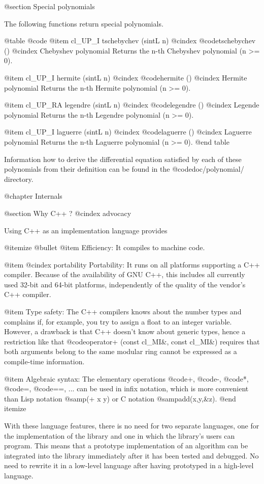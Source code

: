 @section Special polynomials

The following functions return special polynomials.

@table @code
@item cl_UP_I tschebychev (sintL n)
@cindex @code{tschebychev ()}
@cindex Chebyshev polynomial
Returns the n-th Chebyshev polynomial (n >= 0).

@item cl_UP_I hermite (sintL n)
@cindex @code{hermite ()}
@cindex Hermite polynomial
Returns the n-th Hermite polynomial (n >= 0).

@item cl_UP_RA legendre (sintL n)
@cindex @code{legendre ()}
@cindex Legende polynomial
Returns the n-th Legendre polynomial (n >= 0).

@item cl_UP_I laguerre (sintL n)
@cindex @code{laguerre ()}
@cindex Laguerre polynomial
Returns the n-th Laguerre polynomial (n >= 0).
@end table

Information how to derive the differential equation satisfied by each
of these polynomials from their definition can be found in the
@code{doc/polynomial/} directory.


@chapter Internals

@section Why C++ ?
@cindex advocacy

Using C++ as an implementation language provides

@itemize @bullet
@item
Efficiency: It compiles to machine code.

@item
@cindex portability
Portability: It runs on all platforms supporting a C++ compiler. Because
of the availability of GNU C++, this includes all currently used 32-bit and
64-bit platforms, independently of the quality of the vendor's C++ compiler.

@item
Type safety: The C++ compilers knows about the number types and complains if,
for example, you try to assign a float to an integer variable. However,
a drawback is that C++ doesn't know about generic types, hence a restriction
like that @code{operator+ (const cl_MI&, const cl_MI&)} requires that both
arguments belong to the same modular ring cannot be expressed as a compile-time
information.

@item
Algebraic syntax: The elementary operations @code{+}, @code{-}, @code{*},
@code{=}, @code{==}, ... can be used in infix notation, which is more
convenient than Lisp notation @samp{(+ x y)} or C notation @samp{add(x,y,&z)}.
@end itemize

With these language features, there is no need for two separate languages,
one for the implementation of the library and one in which the library's users
can program. This means that a prototype implementation of an algorithm
can be integrated into the library immediately after it has been tested and
debugged. No need to rewrite it in a low-level language after having prototyped
in a high-level language.



